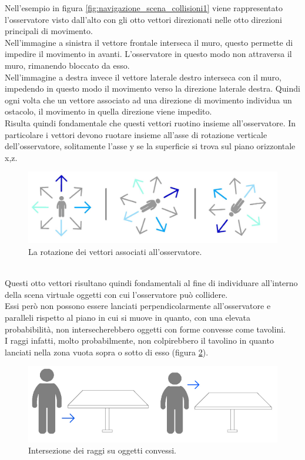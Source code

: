Nell’esempio in figura \ref{fig:navigazione_scena_collisioni1}  viene rappresentato l’osservatore visto dall’alto con gli otto vettori direzionati nelle otto direzioni principali di movimento.
\\
Nell’immagine a sinistra il vettore frontale interseca il muro, questo permette di impedire il movimento in avanti. L’osservatore in questo modo non attraversa il muro, rimanendo bloccato da esso.
\\
Nell’immagine a destra invece il vettore laterale destro interseca con il muro, impedendo in questo modo il movimento verso la direzione laterale destra.
Quindi ogni volta che un vettore associato ad una direzione di movimento individua un ostacolo, il movimento in quella direzione viene impedito.
\\
Risulta quindi fondamentale che questi vettori ruotino insieme all’osservatore. In particolare i vettori devono ruotare insieme all’asse di rotazione verticale dell’osservatore, solitamente l’asse y se la superficie si trova sul piano orizzontale x,z.
\begin{figure}[htb]
 \centering
 \includegraphics[width=1\linewidth]{images/chapter_navigazione_scena/coll_rotat.jpg}\hfill
 \caption[Veduta dall'alto dei vettori dell'osservatore.]{La rotazione dei vettori associati all'osservatore.}
 \label{fig:navigazione_scena_coll_rotat}
\end{figure}
\\
Questi otto vettori risultano quindi fondamentali al fine di individuare all’interno della scena virtuale oggetti con cui l’osservatore può collidere.
\\
Essi però non possono essere lanciati perpendicolarmente all’osservatore e paralleli rispetto al piano in cui si muove in quanto, con una elevata probabibilità, non intersecherebbero oggetti con forme convesse come tavolini.
\\
I raggi infatti, molto probabilmente, non colpirebbero il tavolino in quanto lanciati nella zona vuota sopra o sotto di esso (figura \ref{fig:navigazione_scena_collision_tav1}).
\begin{figure}[htb]
 \centering
 \includegraphics[width=1\linewidth]{images/chapter_navigazione_scena/collision_tav1.png}\hfill
 \caption[Raggi su oggetti convessi.]{Intersezione dei raggi su oggetti convessi.}
 \label{fig:navigazione_scena_collision_tav1}
\end{figure}
